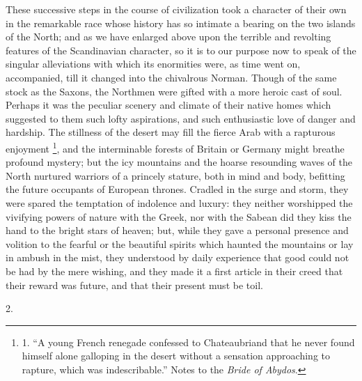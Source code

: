 These successive steps in the
course of civilization took a character of their own in the remarkable
race whose history has so intimate a bearing on the two islands of the
North; and as we have enlarged above upon the terrible and revolting
features of the Scandinavian character, so it is to our purpose now to
speak of the singular alleviations with which its enormities were, as
time went on, accompanied, till it changed into the chivalrous
Norman. Though of the same stock as the Saxons, the Northmen were
gifted with a more heroic cast of soul. Perhaps it was the peculiar
scenery and climate of their native homes which suggested to them such
lofty aspirations, and such enthusiastic love of danger and hardship.
The stillness of the desert may fill the fierce Arab with a rapturous
enjoyment \footnote{1. ``A young French
renegade confessed to Chateaubriand that he never found himself alone
galloping in the desert without a sensation approaching to rapture,
which was indescribable.'' Notes to the \emph{Bride of Abydos}.}, and the
interminable forests of Britain or Germany might breathe profound
mystery; but the icy mountains and the hoarse resounding waves of the
North nurtured warriors of a princely stature, both in mind and body,
befitting the future occupants of European thrones. Cradled in the
surge and storm, they were spared the temptation of indolence and
luxury: they neither worshipped the vivifying powers of nature with
the Greek, nor with the Sabean did they kiss the hand to the bright
stars of heaven; but, while they gave a personal presence and volition
to the fearful or the beautiful spirits which haunted the mountains or
lay in ambush in the mist, they understood by daily experience that
good could not be had by the mere wishing, and they made it a first
article in their creed that their reward was future, and that their
present must be toil.

2.

